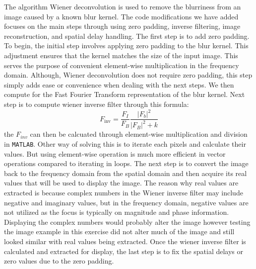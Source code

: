 \documentclass{article}
\begin{document}
	The algorithm Wiener deconvolution is used to remove the blurriness from an image caused by a known blur kernel. The code modifications we have added focuses on the main steps through using 
	zero padding, inverse filtering, image reconstruction, and spatial delay handling. The first step is to add zero padding. To begin, the initial step involves applying zero padding to the blur kernel. 
	This adjustment ensures that the kernel matches the size of the input image. This serves the purpose of convenient element-wise multiplication in the frequency domain. 
	Although, Wiener deconvolution does not require zero padding, this step simply adds ease or convenience when dealing with the next steps. We then compute for the Fast Fourier Transform 
	representation of the blur kernel. Next step is to compute wiener inverse filter through this formula:
	\[F_{\text{inv}} = \frac{F_I}{F_B} \frac{|F_b|^2}{|F_B|^2 + k}\]
	the {\texttt{$F_{inv}$}} can then be calcuated through element-wise multiplication and division in {\texttt{MATLAB}}. Other way of solving this is to iterate each pixels and calculate their values.
	But using element-wise operation is much more efficient in vector operations compared to iterating in loops. The next step is to convert the image back to the frequency domain from the spatial domain
	and then acquire its real values that will be used to display the image. The reason why real values are extracted is because complex numbers in the Wiener inverse filter may include 
	negative and imaginary values, but in the frequency domain, negative values are not utilized as the focus is typically on magnitude and phase information. Displaying the complex numbers would
	probably alter the image however testing the image example in this exercise did not alter much of the image and still looked similar with real values being extracted. Once the wiener inverse filter
	is calculated and extracted for display, the last step is to fix the spatial delays or zero values due to the zero padding.
\end{document}
